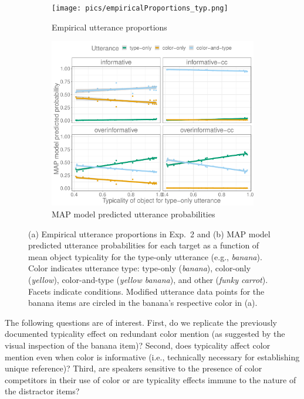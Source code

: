\documentclass[11pt]{article}
\begin{document}
\begin{figure}
\centering
	\begin{subfigure}{.85\textwidth}
		\centering
		\texttt{[image: pics/empiricalProportions\_typ.png]}
		\caption{Empirical utterance proportions}
		\label{fig:exp2empirical}
	\end{subfigure}
	
	\begin{subfigure}{.85\textwidth}
		\centering
		\includegraphics[width=.77\textwidth]{pics/exp2-none-fixedplusempirical-predictives}
		\caption{MAP model predicted utterance probabilities}
		\label{fig:exp2model}
	\end{subfigure}
\caption{(a) Empirical utterance proportions in Exp.~2 and (b) MAP model predicted utterance probabilities for each target as a function of mean object typicality for the type-only utterance (e.g., \emph{banana}). Color indicates utterance type: type-only (\emph{banana}), color-only (\emph{yellow}), color-and-type (\emph{yellow banana}), and other (\emph{funky carrot}). Facets indicate conditions. Modified utterance data points for the banana items are circled in the banana's respective color in (a).}
\label{fig:exp2results}
\end{figure}




The following questions are of interest. First, do we replicate the previously documented typicality effect on redundant color mention (as suggested by the visual inspection of the banana item)? Second, does typicality affect color mention even when color is informative (i.e., technically necessary for establishing unique reference)? Third, are speakers sensitive to the presence of color competitors in their use of color or are typicality effects immune to the nature of the distractor items?
\end{document}
